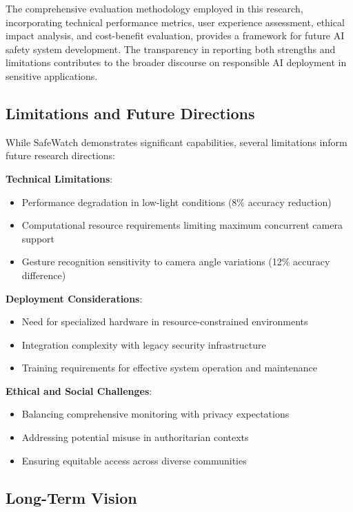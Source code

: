 \documentclass[12pt,a4paper]{article}
\begin{document}
The comprehensive evaluation methodology employed in this research, incorporating technical performance metrics, user experience assessment, ethical impact analysis, and cost-benefit evaluation, provides a framework for future AI safety system development. The transparency in reporting both strengths and limitations contributes to the broader discourse on responsible AI deployment in sensitive applications.

\subsection{Limitations and Future Directions}

While SafeWatch demonstrates significant capabilities, several limitations inform future research directions:

\textbf{Technical Limitations}:
\begin{itemize}
    \item Performance degradation in low-light conditions (8\% accuracy reduction)
    \item Computational resource requirements limiting maximum concurrent camera support
    \item Gesture recognition sensitivity to camera angle variations (12\% accuracy difference)
\end{itemize}

\textbf{Deployment Considerations}:
\begin{itemize}
    \item Need for specialized hardware in resource-constrained environments
    \item Integration complexity with legacy security infrastructure
    \item Training requirements for effective system operation and maintenance
\end{itemize}

\textbf{Ethical and Social Challenges}:
\begin{itemize}
    \item Balancing comprehensive monitoring with privacy expectations
    \item Addressing potential misuse in authoritarian contexts
    \item Ensuring equitable access across diverse communities
\end{itemize}

\subsection{Long-Term Vision}
\end{document}
